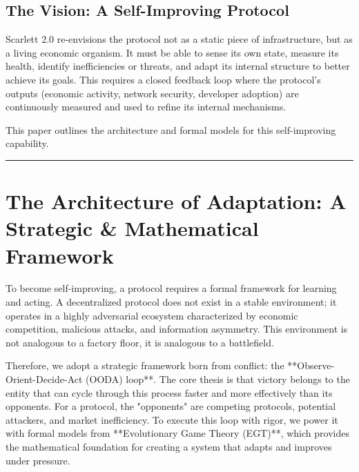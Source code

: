 \documentclass[10pt]{article}
\begin{document}
\subsection{The Vision: A Self-Improving Protocol}
Scarlett 2.0 re-envisions the protocol not as a static piece of infrastructure, but as a living economic organism. It must be able to sense its own state, measure its health, identify inefficiencies or threats, and adapt its internal structure to better achieve its goals. This requires a closed feedback loop where the protocol's outputs (economic activity, network security, developer adoption) are continuously measured and used to refine its internal mechanisms.

This paper outlines the architecture and formal models for this self-improving capability.

\hrule
\vspace{1em}
\section{The Architecture of Adaptation: A Strategic \& Mathematical Framework}
To become self-improving, a protocol requires a formal framework for learning and acting. A decentralized protocol does not exist in a stable environment; it operates in a highly adversarial ecosystem characterized by economic competition, malicious attacks, and information asymmetry. This environment is not analogous to a factory floor, it is analogous to a battlefield.

Therefore, we adopt a strategic framework born from conflict: the **Observe-Orient-Decide-Act (OODA) loop**. The core thesis is that victory belongs to the entity that can cycle through this process faster and more effectively than its opponents. For a protocol, the "opponents" are competing protocols, potential attackers, and market inefficiency. To execute this loop with rigor, we power it with formal models from **Evolutionary Game Theory (EGT)**, which provides the mathematical foundation for creating a system that adapts and improves under pressure.
\end{document}
